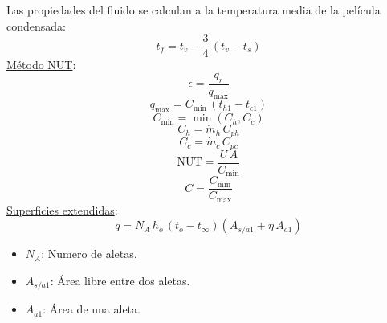 \documentclass[letter,oneside,10pt]{article}
\begin{document}
\begin{multicols}{3}
\begin{equation*}
\end{equation*}
Las propiedades del fluido se calculan a la temperatura media de la película
condensada:
\vspace{-0.2cm}
\begin{equation*}
    t_f = t_v - \frac{3}{4}\,(t_v - t_s)
\end{equation*}
\underline{Método NUT}:
\vspace{-0.3cm}
\begin{equation*}
    \epsilon = \frac{q_r}{q_{\text{max}}}
\end{equation*}
\vspace{-0.3cm}
\begin{equation*}
    q_{\text{max}} = C_{\text{min}}\,(t_{h1} - t_{c1})
\end{equation*}
\vspace{-0.2cm}
\begin{equation*}
    C_{\text{min}} = \min(C_h, C_c)
\end{equation*}
\vspace{-0.2cm}
\begin{equation*}
    C_h = \dot{m}_h\,C_{ph}
\end{equation*}
\vspace{-0.2cm}
\begin{equation*}
    C_c = \dot{m}_c\,C_{pc}
\end{equation*}
\vspace{-0.2cm}
\begin{equation*}
    \text{NUT} = \frac{U\,A}{C_{\text{min}}}
\end{equation*}
\vspace{-0.2cm}
\begin{equation*}
    C = \frac{C_{\text{min}}}{C_{\text{max}}}
\end{equation*}
\underline{Superficies extendidas}:
\vspace{-0.3cm}
\begin{equation*}
    q = N_A\,h_o\,(t_o - t_{\infty})(A_{s/a1} + \eta\,A_{a1})
\end{equation*}
\vspace{-0.3cm}
\tiny
\begin{itemize}
    \item $N_A$: Numero de aletas.
    \item $A_{s/a1}$: Área libre entre dos aletas.
    \item $A_{a1}$: Área de una aleta.
\end{itemize}

\scriptsize
\vspace{-0.5cm}

\end{multicols}
\end{document}
